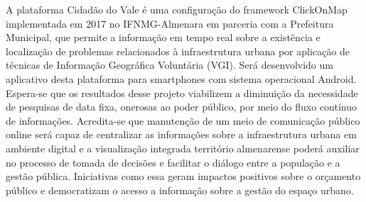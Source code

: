 \documentclass[
12pt,				 %
openright,           %
oneside,			 %
a4paper,			 %
sumario=tradicional, %
chapter=TITLE,		 %
fleqn,				 %
english,
spanish,
brazil,				 %
]{abntex2}%
\begin{document}
	\frenchspacing 
	
	\newcommand{\listofgraficosname}{Lista de gráficos}
	\renewcommand{\cftgraficoname}{\graficoname\space}
	\renewcommand*{\cftgraficoaftersnum}{\hfill\textendash\hfill}
	
	\newcommand{\listofquadrosname}{Lista de quadros}
	\renewcommand{\cftquadroname}{\quadroname\space}
	\renewcommand*{\cftquadroaftersnum}{\hfill\textendash\hfill}
	
	\newcommand{\listofalgoritmosname}{Lista de Algoritmos}
	\renewcommand{\cftalgorithmname}{\algorithmname\space}
	\renewcommand*{\cftalgorithmaftersnum}{\hfill\textendash\hfill}

\pretextual

\imprimircapa
\clearpage

\imprimirfolhaderosto
\clearpage

\begin{resumo}	
	A plataforma Cidadão do Vale é uma configuração do framework ClickOnMap implementada em 2017 no IFNMG-Almenara em parceria com a Prefeitura Municipal, que permite a informação em tempo real sobre a existência e localização de problemas relacionados à infraestrutura urbana por aplicação de técnicas de Informação Geográfica Voluntária (VGI). Será desenvolvido um aplicativo desta plataforma para smartphones com sistema operacional Android. Espera-se que os resultados desse projeto viabilizem a diminuição da necessidade de pesquisas de data fixa, onerosas ao poder público, por meio do fluxo contínuo de informações. Acredita-se que manutenção de um meio de comunicação público online será capaz de centralizar as informações sobre a infraestrutura urbana em ambiente digital e a visualização integrada território almenarense poderá auxiliar no processo de tomada de decisões e facilitar o diálogo entre a população e a gestão pública. Iniciativas como essa geram impactos positivos sobre o orçamento público e democratizam o acesso a informação sobre a gestão do espaço urbano.	
\end{resumo}
\end{document}

